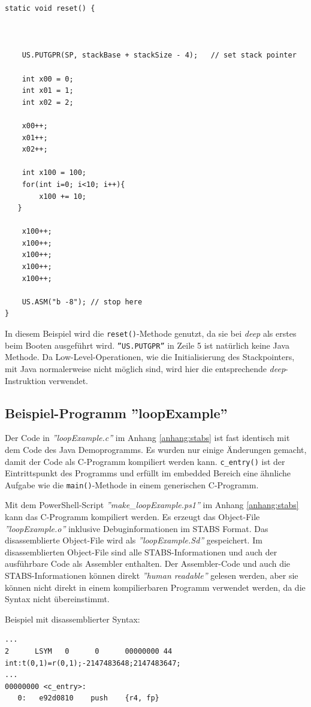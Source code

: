 \lstset{language=java}
\begin{lstlisting}
static void reset() {



	US.PUTGPR(SP, stackBase + stackSize - 4);	// set stack pointer
	
	int x00 = 0;
	int x01 = 1;
	int x02 = 2;
	
	x00++;
	x01++;
	x02++;
	
	int x100 = 100;
	for(int i=0; i<10; i++){
		x100 += 10;
   }
		
	x100++;
	x100++;
	x100++;
	x100++;
	x100++;

	US.ASM("b -8"); // stop here
}
\end{lstlisting}

In diesem Beispiel wird die \texttt{reset()}-Methode genutzt, da sie bei \textit{deep} als erstes beim Booten ausgeführt wird.
\texttt{''US.PUTGPR''} in Zeile 5 ist natürlich keine Java Methode.
Da Low-Level-Operationen, wie die Initialisierung des Stackpointers, mit Java normalerweise nicht möglich sind, wird hier die entsprechende \textit{deep}-Instruktion verwendet.


\subsection{Beispiel-Programm ''loopExample''}
Der Code in \textit{''loopExample.c''} im Anhang \ref{anhang:stabs} ist fast identisch mit dem Code des Java Demoprogramms.
Es wurden nur einige Änderungen gemacht, damit der Code als C-Programm kompiliert werden kann.
\texttt{c\_entry()} ist der Eintrittspunkt des Programms und erfüllt im embedded Bereich eine ähnliche Aufgabe wie die  \texttt{main()}-Methode in einem generischen C-Programm.

Mit dem PowerShell-Script \textit{''make\_loopExample.ps1''} im Anhang \ref{anhang:stabs} kann das C-Programm kompiliert werden.
Es erzeugt das Object-File \textit{''loopExample.o''} inklusive Debuginformationen im STABS Format.
Das disassemblierte Object-File wird als \textit{''loopExample.Sd''} gespeichert.
Im disassemblierten Object-File sind alle STABS-Informationen und auch der ausführbare Code als Assembler enthalten.
Der Assembler-Code und auch die STABS-Informationen können direkt \textit{''human readable''} gelesen werden, aber sie können nicht direkt in einem kompilierbaren Programm verwendet werden, da die Syntax nicht übereinstimmt.

Beispiel mit disassemblierter Syntax:
\lstset{language=plain}
\begin{lstlisting}
...
2      LSYM   0      0      00000000 44     int:t(0,1)=r(0,1);-2147483648;2147483647;
...
00000000 <c_entry>:
   0:	e92d0810 	push	{r4, fp}
\end{lstlisting}


